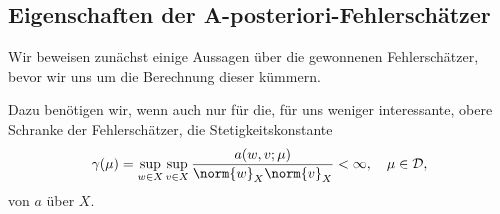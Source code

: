 
\subsection{Eigenschaften der A-posteriori-Fehlerschätzer} %
\label{sub:eigenschaften_der_a_}

Wir beweisen zunächst einige Aussagen über die gewonnenen Fehlerschätzer, bevor wir uns um die Berechnung dieser kümmern.

Dazu benötigen wir, wenn auch nur für die, für uns weniger interessante, obere Schranke der Fehlerschätzer, die Stetigkeitskonstante
\begin{equation}
    \gamma(\mu) = \sup_{w \in X} \sup_{v \in X} \frac{a(w, v; \mu)}{\norm{w}_X \norm{v}_X} < \infty, \quad \mu \in \mathcal D,
\end{equation}
von $a$ über $X$.

